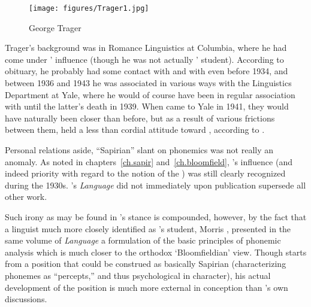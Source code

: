 \begin{wrapfigure}[11]{r}{.35\textwidth}
  \texttt{[image: figures/Trager1.jpg]}
  \caption{George Trager}
  \label{fig:ch.structuralists.trager}
\end{wrapfigure}
Trager's background was in Romance Linguistics at Columbia, where he
had come under {\Boas}' influence (though he was not actually {\Boas}'
student). According to  obituary, he
probably had some contact with {\Sapir} and with {\Swadesh} even before
1934, and between 1936 and 1943 he was associated in various ways with
the Linguistics Department at Yale, where he would of course have been
in {regular} association with {\Sapir} until the latter's death in
1939. When {\Bloomfield} came to Yale in 1941, they would have naturally
been closer than before, but as a result of various frictions between
them, {\Trager} held a less than cordial attitude toward {\Bloomfield},
according to {\Hockett}.

Personal relations aside,  ``Sapirian''
slant on phonemics was not really an anomaly. As noted in
chapters~\ref{ch.sapir} and~\ref{ch.bloomfield}, {\Sapir}'s influence
(and indeed priority with regard to the notion of the ) was
still clearly recognized during the 1930s. {\Bloomfield}'s
\textsl{Language} did not immediately upon publication supersede all
other work.

Such irony as may be found in {\Trager}'s stance is compounded, however,
by the fact that a linguist much more closely identified as {\Sapir}'s
student, Morris \citet{swadesh34:phoneme}, presented in the same
volume of \textsl{Language} a formulation of the basic principles of
phonemic analysis which is much closer to the orthodox `Bloomfieldian'
view. Though {\Swadesh} starts from a position that could be construed as
basically Sapirian (characterizing phonemes as ``percepts,'' and thus
psychological in character), his actual development of the position is
much more external in conception than {\Sapir}'s own discussions.

